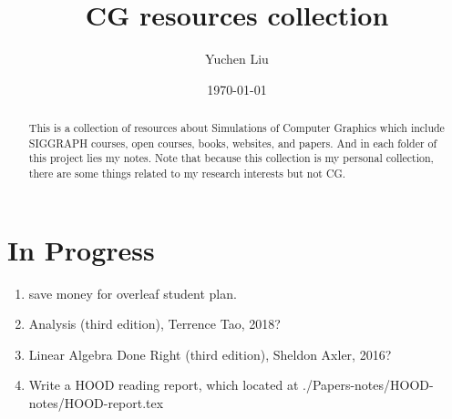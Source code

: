 \documentclass{article}
\title{CG resources collection}
\author{Yuchen Liu}
\date{\today}
\begin{document}
\setcounter{section}{-1}
\maketitle
\tableofcontents

\begin{abstract}
    This is a collection of resources about Simulations of Computer Graphics which include SIGGRAPH courses, open courses, books, websites, and papers. And in each folder of this project lies my notes. Note that because this collection is my personal collection, there are some things related to my research interests but not CG.
\end{abstract}

\section{In Progress}
\begin{enumerate}
    \item save money for overleaf student plan.
    \item Analysis (third edition), Terrence Tao, 2018?
    \item Linear Algebra Done Right (third edition), Sheldon Axler, 2016?
    \item Write a HOOD reading report, which located at ./Papers-notes/HOOD-notes/HOOD-report.tex
\end{enumerate}

\newpage
\end{document}
